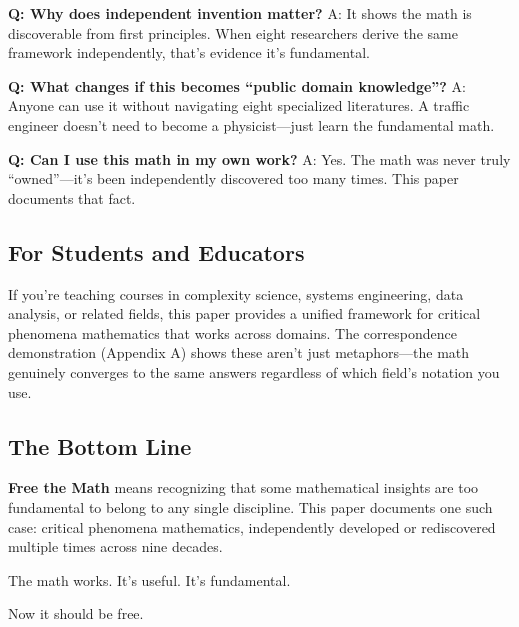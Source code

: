 \documentclass[11pt]{article}
\begin{document}
\textbf{Q: Why does independent invention matter?}
A: It shows the math is discoverable from first principles. When eight researchers derive the same framework independently, that's evidence it's fundamental.

\textbf{Q: What changes if this becomes ``public domain knowledge''?}
A: Anyone can use it without navigating eight specialized literatures. A traffic engineer doesn't need to become a physicist---just learn the fundamental math.

\textbf{Q: Can I use this math in my own work?}
A: Yes. The math was never truly ``owned''---it's been independently discovered too many times. This paper documents that fact.

\subsection*{For Students and Educators}

If you're teaching courses in complexity science, systems engineering, data analysis, or related fields, this paper provides a unified framework for critical phenomena mathematics that works across domains. The correspondence demonstration (Appendix A) shows these aren't just metaphors---the math genuinely converges to the same answers regardless of which field's notation you use.

\subsection*{The Bottom Line}

\textbf{Free the Math} means recognizing that some mathematical insights are too fundamental to belong to any single discipline. This paper documents one such case: critical phenomena mathematics, independently developed or rediscovered multiple times across nine decades.

The math works. It's useful. It's fundamental.

Now it should be free.
\end{document}
